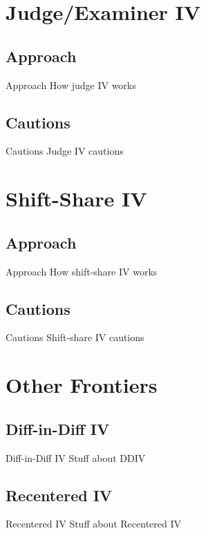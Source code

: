 \documentclass{beamer}
\begin{document}

\section{Judge/Examiner IV}

\subsection{Approach}
\begin{frame}{Approach}
How judge IV works
\end{frame}

\subsection{Cautions}
\begin{frame}{Cautions}
Judge IV cautions
\end{frame}

\section{Shift-Share IV}

\subsection{Approach}
\begin{frame}{Approach}
How shift-share IV works
\end{frame}

\subsection{Cautions}
\begin{frame}{Cautions}
Shift-share IV cautions
\end{frame}

\section{Other Frontiers}

\subsection{Diff-in-Diff IV}
\begin{frame}{Diff-in-Diff IV}
Stuff about DDIV
\end{frame}

\subsection{Recentered IV}
\begin{frame}{Recentered IV}
Stuff about Recentered IV
\end{frame}
\end{document}
